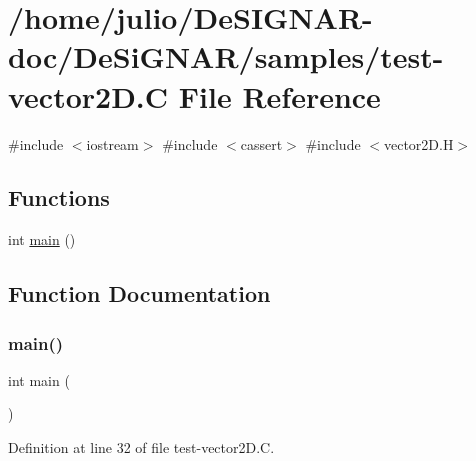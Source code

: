 \hypertarget{test-vector2_d_8_c}{}\section{/home/julio/\+De\+S\+I\+G\+N\+A\+R-\/doc/\+De\+Si\+G\+N\+A\+R/samples/test-\/vector2D.C File Reference}
\label{test-vector2_d_8_c}
{\ttfamily \#include $<$iostream$>$}\newline
{\ttfamily \#include $<$cassert$>$}\newline
{\ttfamily \#include $<$vector2\+D.\+H$>$}\newline
\subsection*{Functions}
\begin{DoxyCompactItemize}
\item 
int \hyperlink{test-vector2_d_8_c_ae66f6b31b5ad750f1fe042a706a4e3d4}{main} ()
\end{DoxyCompactItemize}


\subsection{Function Documentation}
\mbox{\label{test-vector2_d_8_c_ae66f6b31b5ad750f1fe042a706a4e3d4}} 
\subsubsection{\texorpdfstring{main()}{main()}}
{\footnotesize\ttfamily int main (\begin{DoxyParamCaption}{ }\end{DoxyParamCaption})}



Definition at line 32 of file test-\/vector2\+D.\+C.

